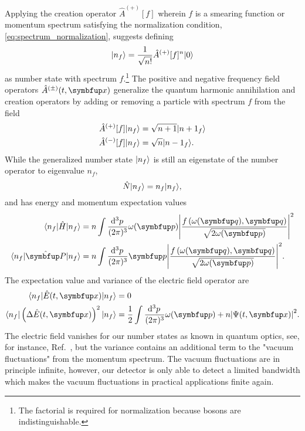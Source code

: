 Applying the creation operator $\hat{A}^{(+)}[f]$ wherein $f$ is a smearing function or momentum spectrum satisfying the normalization condition, \cref{eq:spectrum_normalization}, suggests defining
\begin{equation}
	\lvert n_f\rangle
	=
	\frac{1}{\sqrt{n!}}
	\hat{A}^{(+)}[f]^n
	\lvert0\rangle
	\label{eq:number_state}
\end{equation}
as number state with spectrum $f$.\footnote{The factorial is required for normalization because bosons are indistinguishable.}
The positive and negative frequency field operators $\hat{A}^{(\pm)}(t,\vb{x})$ generalize the quantum harmonic annihilation and creation operators by adding or removing a particle with spectrum $f$ from the field
\begin{align}
	\hat{A}^{(+)}[f]
	\lvert n_f\rangle
	&=
	\sqrt{n+1}
	\lvert{n+1}_f\rangle
	\\
	\hat{A}^{(-)}[f]
	\lvert n_f\rangle
	&=
	\sqrt{n}
	\lvert{n-1}_f\rangle
	.
\end{align}
While the generalized number state $\lvert n_f\rangle$ is still an eigenstate of the number operator to eigenvalue $n_f$,
\begin{equation}
	\hat{N}
	\lvert n_f\rangle
	=
	n_f
	\lvert n_f\rangle
	,
\end{equation}
and has energy and momentum expectation values
\begin{align}
	\bra{n_f}
	\hat{H}
	\ket{n_f}
	&=
	n
	\int\frac{\dd[3]{p}}{(2\pi)^3}
	\omega(\vb{p})
	\abs*{\frac{f\left(\omega(\vb{q}),\vb{q}\right)}{\sqrt{2\omega(\vb{p})}}}^2
	\\
	\bra{n_f}
	\vu{P}
	\ket{n_f}
	&=
	n
	\int\frac{\dd[3]{p}}{(2\pi)^3}
	\vb{p}
	\abs*{\frac{f\left(\omega(\vb{q}),\vb{q}\right)}{\sqrt{2\omega(\vb{p})}}}^2
	.
\end{align}
The expectation value and variance of the electric field operator are
\begin{align}
	\bra{n_f}
	\hat{E}(t,\vb{x})
	\ket{n_f}
	&=
	0
	\\
	\bra{n_f}
	\left(
		\Delta
		\hat{E}(t,\vb{x})
	\right)^2
	\ket{n_f}
	&=
	\frac{1}{2}
	\int\frac{\dd[3]{p}}{(2\pi)^3}
	\omega(\vb{p})
	+
	n
	\abs*{\Psi(t,\vb{x})}^2
	.
\end{align}
The electric field vanishes for our number states as known in quantum optics, see, for instance, Ref.~\cite{Gerry2005}, but the variance contains an additional term to the "vacuum fluctuations" from the momentum spectrum.
The vacuum fluctuations are in principle infinite, however, our detector is only able to detect a limited bandwidth which makes the vacuum fluctuations in practical applications finite again.

